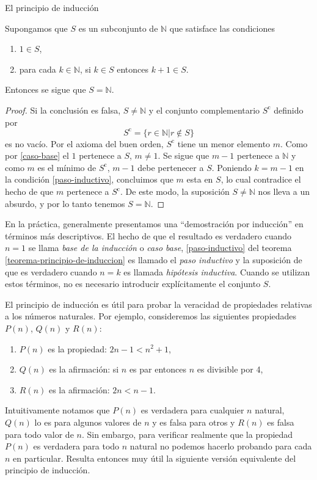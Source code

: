 \begin{section}{El principio de inducción}
\begin{teorema}\label{teorema-principio-de-induccion} Supongamos que $S$ es un subconjunto de $\mathbb N$ que satisface las condiciones 
\begin{enumerate}[label=\textit{\alph*)}]
\item\label{caso-base} $1 \in S$,
\item\label{paso-inductivo} para cada $k \in \mathbb N$, si $ k \in S$ entonces $k+1\in S$.
\end{enumerate}
Entonces se sigue que $S=\mathbb N$.
\end{teorema}
\begin{proof}Si la conclusión es falsa, $S \not= \mathbb N$ y
el conjunto complementario $S^{\text{c}}$ definido por
$$
S^{\text{c}}= \{ r \in \mathbb N | r\not\in S\}
$$
 es no vacío. Por el axioma del buen orden, $S^{\text{c}}$ tiene un menor elemento $m$. Como por \ref{caso-base} el $1$ pertenece a $S$, $m\not=1$. Se sigue que $m-1$ pertenece a $\mathbb N$ y como $m$ es el mínimo de $S^{\text{c}}$, $m-1$ debe pertenecer a $S$. Poniendo $k=m-1$ en la condición \ref{paso-inductivo}, concluimos que $m$ esta en $S$, lo cual contradice el hecho de que $m$ pertenece a $S^{\text{c}}$. De este modo, la suposición $S \not= \mathbb N$ nos lleva a un absurdo, y por lo tanto tenemos $S= \mathbb N$. 
 \end{proof}

En la práctica, generalmente presentamos una ``demostración por inducción'' en términos más descriptivos. El hecho de que el resultado es verdadero cuando $n=1$ se llama \textit{base de la inducción} o \textit{caso base}, \ref{paso-inductivo} del teorema \ref{teorema-principio-de-induccion} es llamado  el {\em paso inductivo} y la suposición de que es verdadero cuando $n=k$ es llamada \textit{hipótesis inductiva}. Cuando se utilizan estos términos, no es necesario introducir explícitamente el conjunto $S$.


El principio de inducción es útil para probar la veracidad de propiedades relativas a los números naturales. Por ejemplo, consideremos las siguientes propiedades $P(n)$, $Q(n)$ y $R(n)$:
\begin{enumerate}[label=\textit{\alph*)}]
\item $P(n)$ es la propiedad: $2n -1 < n^2 + 1$,
\item $Q(n)$ es la afirmación: si $n$ es par entonces $n$ es divisible por 4,
\item $R(n)$ es la afirmación: $2n < n- 1$.
\end{enumerate}
Intuitivamente notamos que $P(n)$ es verdadera para cualquier $n$ natural, $Q(n)$ lo es para algunos valores de $n$ y es falsa para otros y $R(n)$ es falsa para todo valor de $n$. Sin embargo, para verificar realmente que la propiedad $P(n)$ es verdadera para todo $n$ natural no podemos hacerlo probando para cada $n$ en particular. Resulta entonces muy útil la siguiente versión equivalente del principio de inducción.


\end{section}
